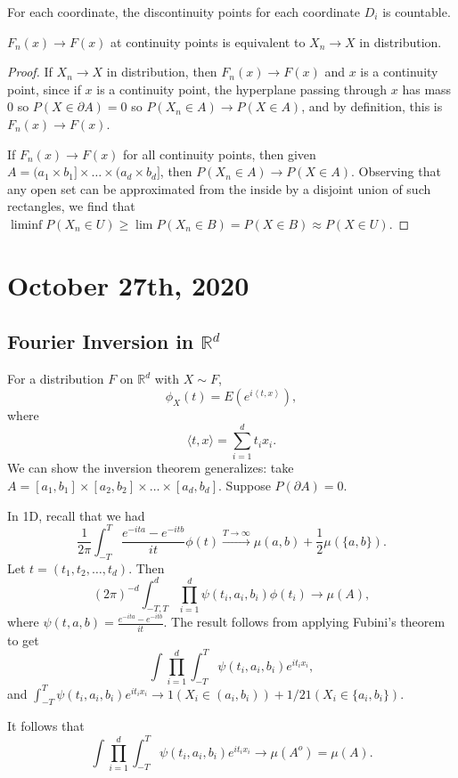 \documentclass[11pt]{scrartcl}
\newcommand{\R}{\mathbb{R}}
\begin{document}
\begin{exercise} For each coordinate, the discontinuity points for each coordinate $D_i$ is countable.  
\end{exercise}

\begin{thm} $F_n(x) \to F(x)$ at continuity points is equivalent to $X_n \to X$ in distribution.
\end{thm}
\begin{proof}
If $X_n \to X$ in distribution, then $F_n(x) \to F(x)$ and $x$ is a continuity point, since if $x$ is a continuity point, the hyperplane passing through $x$ has mass $0$ so $P(X \in \partial A) = 0$ so $P(X_n \in A )\to P(X \in A)$, and by definition, this is $F_n(x) \to F(x)$.

If $F_n(x) \to F(x)$ for all continuity points, then given $A = (a_1 \times b_1] \times \dots \times (a_d \times b_d]$, then $P(X_n \in A) \to P(X \in A)$.  Observing that any open set can be approximated from the inside by a disjoint union of such rectangles, we find that $\liminf P(X_n \in U) \ge \lim P(X_n \in B) = P(X \in B) \approx P(X \in U)$.
\end{proof}
\section{October 27th, 2020}
\subsection{Fourier Inversion in $\R^d$}
For a distribution $F$ on $\R^d$ with $X \sim F$, 
$$\phi_X(t) = E(e^{i\left<t, x\right>}),$$
where $$\langle t, x \rangle = \sum_{i=1}^{d} t_i x_i.$$
We can show the inversion theorem generalizes:  take $A = [a_1, b_1] \times [a_2, b_2] \times \dots \times [a_d, b_d].$  Suppose $P(\partial A) = 0$.  

In 1D, recall that we had
$$\frac{1}{2\pi} \int_{-T}^T \frac{e^{-ita} - e^{-itb}}{it} \phi(t) \xrightarrow {T \to \infty}  \mu(a, b) + \frac{1}{2}\mu(\{a, b\}).$$
Let $t = (t_1, t_2, \dots, t_d)$.  Then 
$$(2\pi)^{-d}\int_{-T, T}^d \prod_{i=1}^d \psi(t_i, a_i, b_i) \phi(t_i) \to \mu(A),$$
where $\psi(t, a, b) = \frac{e^{-ita} - e^{-itb}}{it}.$  The result follows from applying Fubini's theorem to get 
$$\int \prod_{i=1}^{d} \int_{-T}^T \psi(t_i, a_i, b_i) e^{it_i x_i},$$
and $\int_{-T}^T \psi(t_i, a_i, b_i) e^{it_i x_i} \to 1(X_i \in (a_i, b_i)) + 1/2 1(X_i \in \{a_i, b_i\}).$

It follows that 
$$\int \prod_{i=1}^{d} \int_{-T}^T \psi(t_i, a_i, b_i) e^{it_i x_i} \to \mu(A^o) = \mu(A).$$
\end{document}
